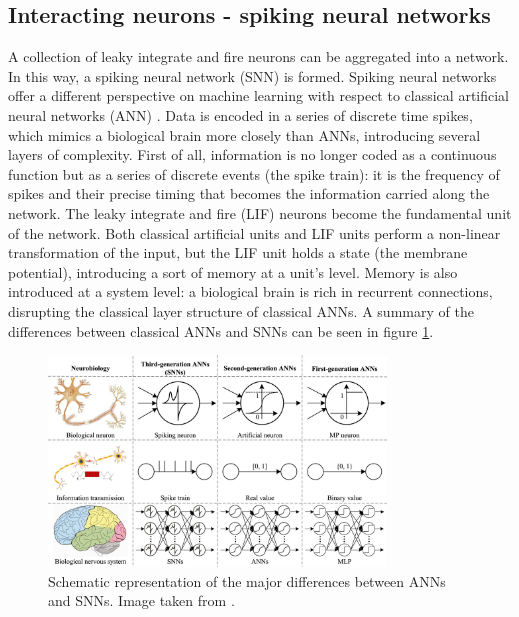   \subsection{Interacting neurons - spiking neural networks}
  A collection of leaky integrate and fire neurons can be aggregated into a network.
  In this way, a spiking neural network (SNN) is formed.
  Spiking neural networks offer a different perspective on machine learning with respect to classical artificial neural networks (ANN) \cite{snn-review}.
  Data is encoded in a series of discrete time spikes, which mimics a biological brain more closely than ANNs, introducing several layers of complexity.
  First of all, information is no longer coded as a continuous function but as a series of discrete events (the spike train): it is the frequency of spikes and their precise timing that becomes the information carried along the network.
  The leaky integrate and fire (LIF) neurons become the fundamental unit of the network.
  Both classical artificial units and LIF units perform a non-linear transformation of the input, but the LIF unit holds a state (the membrane potential), introducing a sort of memory at a unit's level.
  Memory is also introduced at a system level: a biological brain is rich in recurrent connections, disrupting the classical layer structure of classical ANNs.
  A summary of the differences between classical ANNs and SNNs can be seen in figure \ref{fig:ann-vs-snn}.

  \begin{figure}
    \centering
    \includegraphics[width=0.8\textwidth]{ann-vs-snn}
    \caption{Schematic representation of the major differences between ANNs and SNNs. Image taken from \cite{ann-vs-snn}.}
    \label{fig:ann-vs-snn}
  \end{figure}

